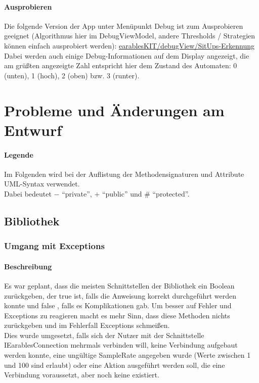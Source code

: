 \documentclass[a4paper,12pt]{article}
\begin{document}
\paragraph{Ausprobieren}
Die folgende Version der App unter Menüpunkt Debug ist zum Ausprobieren geeignet (Algorithmus hier im DebugViewModel, andere Thresholds / Strategien können einfach ausprobiert werden): 
\href{https://github.com/vlle1/earablesKIT/tree/cd774e370156ea3d13eff2879a2d7f0f7d541260}{earablesKIT/debugView/SitUps-Erkennung}\\
Dabei werden auch einige Debug-Informationen auf dem Display angezeigt, die am grüßten angezeigte Zahl entspricht hier dem Zustand des Automaten: 0 (unten), 1 (hoch), 2 (oben) bzw. 3 (runter).
\clearpage

\section{Probleme und Änderungen am Entwurf}
\label{aenderungen}
\paragraph{Legende}
Im Folgenden wird bei der Auflistung der Methodensignaturen und Attribute UML-Syntax verwendet.\\
Dabei bedeutet $-$ ``private'', $+$ ``public'' und \# ``protected''.
\subsection{Bibliothek}

\subsubsection{Umgang mit Exceptions}
\paragraph{Beschreibung}
Es war geplant, dass die meisten Schnittstellen der Bibliothek ein Boolean zurückgeben, der true ist, falls die Anweisung korrekt durchgeführt werden konnte und false , falls es Komplikationen gab.
Um besser auf Fehler und Exceptions zu reagieren macht es mehr Sinn, dass diese Methoden nichts zurückgeben und im Fehlerfall Exceptions schmeißen.\\
Dies wurde umgesetzt, falls sich der Nutzer mit der Schnittstelle IEarablesConnection mehrmals verbinden will, keine Verbindung aufgebaut werden konnte, eine ungültige SampleRate angegeben wurde (Werte zwischen 1 und 100 sind erlaubt) oder eine Aktion ausgeführt werden soll, die eine Verbindung voraussetzt, aber noch keine existiert.
\end{document}
